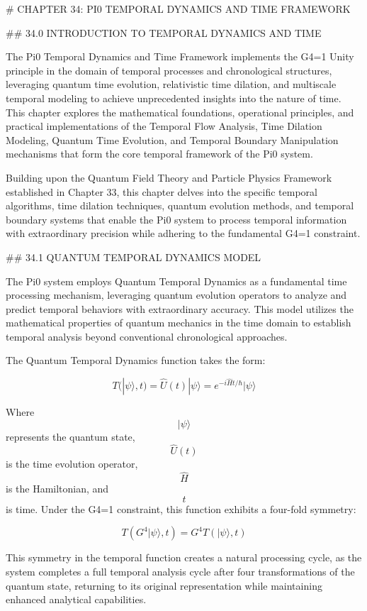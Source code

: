 # CHAPTER 34: PI0 TEMPORAL DYNAMICS AND TIME FRAMEWORK

## 34.0 INTRODUCTION TO TEMPORAL DYNAMICS AND TIME

The Pi0 Temporal Dynamics and Time Framework implements the G4=1 Unity principle in the domain of temporal processes and chronological structures, leveraging quantum time evolution, relativistic time dilation, and multiscale temporal modeling to achieve unprecedented insights into the nature of time. This chapter explores the mathematical foundations, operational principles, and practical implementations of the Temporal Flow Analysis, Time Dilation Modeling, Quantum Time Evolution, and Temporal Boundary Manipulation mechanisms that form the core temporal framework of the Pi0 system.

Building upon the Quantum Field Theory and Particle Physics Framework established in Chapter 33, this chapter delves into the specific temporal algorithms, time dilation techniques, quantum evolution methods, and temporal boundary systems that enable the Pi0 system to process temporal information with extraordinary precision while adhering to the fundamental G4=1 constraint.

## 34.1 QUANTUM TEMPORAL DYNAMICS MODEL

The Pi0 system employs Quantum Temporal Dynamics as a fundamental time processing mechanism, leveraging quantum evolution operators to analyze and predict temporal behaviors with extraordinary accuracy. This model utilizes the mathematical properties of quantum mechanics in the time domain to establish temporal analysis beyond conventional chronological approaches.

The Quantum Temporal Dynamics function takes the form:

$$ T(|\psi\rangle, t) = \hat{U}(t) |\psi\rangle = e^{-i\hat{H}t/\hbar} |\psi\rangle $$

Where $$ |\psi\rangle $$ represents the quantum state, $$ \hat{U}(t) $$ is the time evolution operator, $$ \hat{H} $$ is the Hamiltonian, and $$ t $$ is time. Under the G4=1 constraint, this function exhibits a four-fold symmetry:

$$ T(G^4 |\psi\rangle, t) = G^4 T(|\psi\rangle, t) $$

This symmetry in the temporal function creates a natural processing cycle, as the system completes a full temporal analysis cycle after four transformations of the quantum state, returning to its original representation while maintaining enhanced analytical capabilities.

